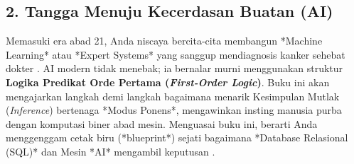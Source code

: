 \subsection{2. Tangga Menuju Kecerdasan Buatan (AI)}

Memasuki era abad 21, Anda niscaya bercita-cita membangun *Machine Learning* atau *Expert Systems* yang sanggup mendiagnosis kanker sehebat dokter \cite{saylor_cs202}. AI modern tidak menebak; ia bernalar murni menggunakan struktur \textbf{Logika Predikat Orde Pertama (\textit{First-Order Logic})}. Buku ini akan mengajarkan langkah demi langkah bagaimana menarik Kesimpulan Mutlak (\textit{Inference}) bertenaga *Modus Ponens*, mengawinkan insting manusia purba dengan komputasi biner abad mesin. Menguasai buku ini, berarti Anda menggenggam cetak biru (*blueprint*) sejati bagaimana *Database Relasional (SQL)* dan Mesin *AI* mengambil keputusan \cite{rosen2019}.
